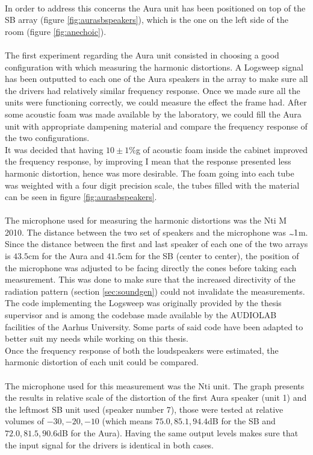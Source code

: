 \\
In order to address this concerns the Aura unit has been positioned on top of the SB array (figure \ref{fig:aurasbspeakers}), which is the one on the left side of the room (figure \ref{fig:anechoic}).
\\
\\
The first experiment regarding the Aura unit consisted in choosing a good configuration with which measuring the harmonic distortions.
A Logsweep signal has been outputted to each one of the Aura speakers in the array to make sure all the drivers had relatively similar frequency response. Once we made sure all the units were functioning correctly, we could measure the effect the frame had. After some acoustic foam was made available by the laboratory, we could fill the Aura unit with appropriate dampening material and compare the frequency response of the two configurations.
\\
It was decided that having $10 \pm 1\%$g of acoustic foam inside the cabinet improved the frequency response, by improving I mean that the response presented less harmonic distortion, hence was more desirable. The foam going into each tube was weighted with a four digit precision scale, the tubes filled with the material can be seen in figure \ref{fig:aurasbspeakers}.
\\
\\
The microphone used for measuring the harmonic distortions was the Nti M 2010. The distance between the two set of speakers and the microphone was $\tld 1$m. Since the distance between the first and last speaker of each one of the two arrays is $43.5$cm for the Aura and $41.5$cm for the SB (center to center), the position of the microphone was adjusted to be facing directly the cones before taking each measurement. This was done to make sure that the increased directivity of the radiation pattern (section \ref{sec:soundgen}) could not invalidate the measurements.
\\
The code implementing the Logsweep was originally provided by the thesis supervisor and is among the codebase made available by the AUDIOLAB facilities of the Aarhus University. Some parts of said code have been adapted to better suit my needs while working on this thesis.
\\
Once the frequency response of both the loudspeakers were estimated, the harmonic distortion of each unit could be compared.
\\
\\
The microphone used for this measurement was the Nti unit.
The graph presents the results in relative scale of the distortion of the first Aura speaker (unit 1) and the leftmost SB unit used (speaker number 7), those were tested at relative volumes of $-30, -20, -10$ (which means $75.0, 85.1, 94.4$dB for the SB and $72.0, 81.5, 90.6$dB for the Aura). Having the same output levels makes sure that the input signal for the drivers is identical in both cases.

